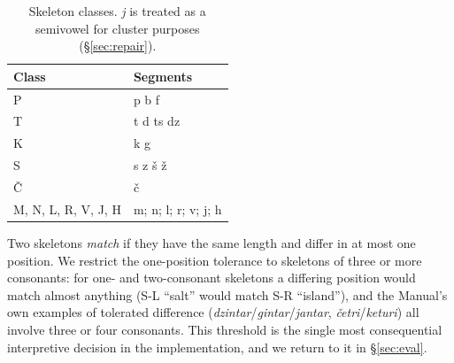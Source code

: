 \begin{table}[t]
\centering\small
\caption{Skeleton classes. \emph{j} is treated as a semivowel for cluster purposes (\S\ref{sec:repair}).}
\label{tab:classes}
\begin{tabular}{@{}ll@{}}
\toprule
Class & Segments \\
\midrule
P & p b f \\
T & t d ts dz \\
K & k g \\
S & s z š ž \\
Č & č \\
M, N, L, R, V, J, H & m; n; l; r; v; j; h \\
\bottomrule
\end{tabular}
\end{table}

Two skeletons \emph{match} if they have the same length and differ in at most one position. We restrict the one-position tolerance to skeletons of three or more consonants: for one- and two-consonant skeletons a differing position would match almost anything (S-L ``salt'' would match S-R ``island''), and the Manual's own examples of tolerated difference (\emph{dzintar}/\emph{gintar}/\emph{jantar}, \emph{četri}/\emph{keturi}) all involve three or four consonants. This threshold is the single most consequential interpretive decision in the implementation, and we return to it in \S\ref{sec:eval}.
